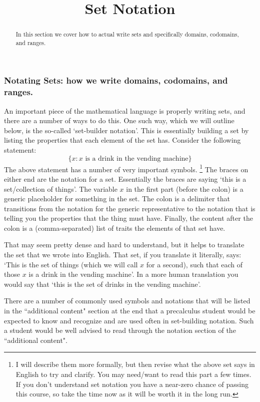 \documentclass{ximeraXloud}
\title{Set Notation}
\begin{document}
\begin{abstract}
    In this section we cover how to actual write sets and specifically domains, codomains, and ranges.
\end{abstract}
\maketitle


\subsubsection*{Notating Sets: how we write domains, codomains, and ranges.}

    An important piece of the mathematical language is properly writing sets, and there are a number of ways to do this. One such way, which we will outline below, is the so-called `set-builder notation'. This is essentially building a set by listing the properties that each element of the set has. Consider the following statement:
    \[
        \{x : x \text{ is a drink in the vending machine} \}
    \]
    The above statement has a number of very important symbols.%
\footnote{%
    I will describe them more formally, but then revise what the above set says in English to try and clarify. You may need/want to read this part a few times. If you don't understand set notation you have a near-zero chance of passing this course, so take the time now as it will be worth it in the long run.
    }
    The braces on either end are the notation for a set. Essentially the braces are saying `this is a set/collection of things'. The variable $x$ in the first part (before the colon) is a generic placeholder for something in the set. The colon is a delimiter that transitions from the notation for the generic representative to the notation that is telling you the properties that the thing must have. Finally, the content after the colon is a (comma-separated) list of traits the elements of that set have.
    
    That may seem pretty dense and hard to understand, but it helps to translate the set that we wrote into English. That set, if you translate it literally, says: `This is the set of things (which we will call $x$ for a second), such that each of those $x$ is a drink in the vending machine'. In a more human translation you would say that `this is the set of drinks in the vending machine'.
    
    There are a number of commonly used symbols and notations that will be listed in the ``additional content" section at the end that a precalculus student would be expected to know and recognize and are used often in set-building notation. Such a student would be well advised to read through the notation section of the ``additional content".
    
\end{document}

